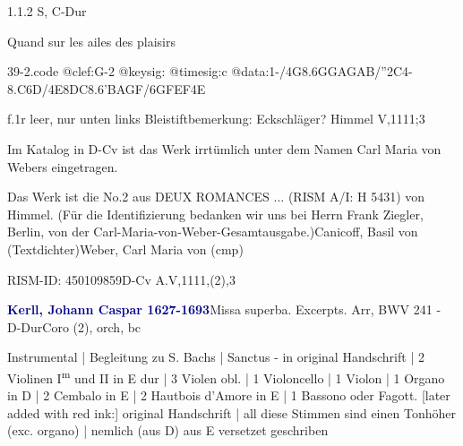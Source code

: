 \documentclass[a4paper, twocolumn, 11pt]{book}
\begin{document}
\newline %
\par 1.1.2  S, C-Dur\newline \begin{footnotesize} Quand sur les ailes des plaisirs \end{footnotesize}  
\begin{filecontents*}{39-2.code}
@clef:G-2
@keysig:
@timesig:c
@data:1-/4G8.6GGAGAB/''2C4-{8.C6D}/4E8DC8.6'{BA}GF/6{GFEF}4E
\end{filecontents*}
\newline %
\par f.1r leer, nur unten links Bleistiftbemerkung: {\textquotedbl}Eckschläger? Himmel V,1111;3{\textquotedbl}
\par Im Katalog in D-Cv ist das Werk irrtümlich unter dem Namen Carl Maria von Webers eingetragen.
\par Das Werk ist die No.2 aus {\textquotedbl}DEUX ROMANCES ...{\textquotedbl}  (RISM A/I: H 5431) von Himmel. (Für die Identifizierung bedanken wir uns bei Herrn Frank Ziegler, Berlin, von der Carl-Maria-von-Weber-Gesamtausgabe.)\newline Canicoff, Basil von  (Textdichter)\newline Weber, Carl Maria von  (cmp)
\par RISM-ID: 450109859\newline D-Cv  A.V,1111,(2),3
\par \vspace{16pt} \textcolor{darkblue}{\textbf{Kerll, Johann Caspar  1627-1693}}\hfillplus{[40]}\newline Missa superba. Excerpts. Arr, BWV 241 - D-Dur\newline Coro (2), orch, bc
\par \begin{itshape} Instrumental | Begleitung zu S. Bachs | Sanctus - in original Handschrift | 2 Violinen I\textsuperscript{m} und II in E dur | 3 Violen obl. | 1 Violoncello | 1 Violon | 1 Organo in D | 2 Cembalo in E | 2 Hautbois d'Amore in E | 1 Bassono oder Fagott. [later added with red ink:]  original Handschrift | all diese Stimmen sind einen Tonhöher (exc. organo) | nemlich (aus D) aus E versetzet geschriben\end{itshape} 
\end{document}
